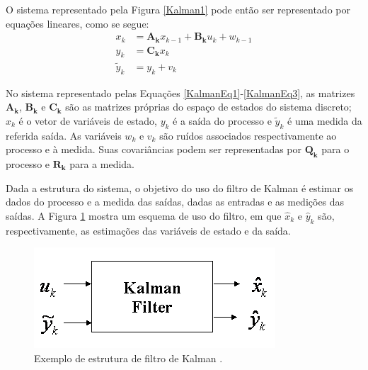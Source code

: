 O sistema representado pela Figura \ref{Kalman1} pode então ser representado por equações lineares, como se segue:
\begin{align}
	\label{KalmanEq1}
	x_k &= \mathbf{A_k} x_{k-1} + \mathbf{B_k} u_k + w_{k-1} \\
	\label{KalmanEq2}
	y_k &= \mathbf{C_k} x_k \\
	\label{KalmanEq3}
	\tilde{y}_k &= y_k + v_k
\end{align}

No sistema representado pelas Equações \ref{KalmanEq1}-\ref{KalmanEq3}, as matrizes $\mathbf{A_k}$, $\mathbf{B_k}$ e $\mathbf{C_k}$ são as matrizes próprias do espaço de estados do sistema discreto; $x_k$ é o vetor de variáveis de estado, $y_k$ é a saída do processo e $\tilde{y}_k$ é uma medida da referida saída. As variáveis $w_k$ e $v_k$ são ruídos associados respectivamente ao processo e à medida. Suas covariâncias podem ser representadas por $\mathbf{Q_k}$ para o processo e $\mathbf{R_k}$ para a medida.

Dada a estrutura do sistema, o objetivo do uso do filtro de Kalman é estimar os dados do processo e a medida das saídas, dadas as entradas e as medições das saídas. A Figura \ref{Kalman2} mostra um esquema de uso do filtro, em que $\hat{x}_k$ e $\hat{y}_k$ são, respectivamente, as estimações das variáveis de estado e da saída.
\begin{figure}[!ht]
\centering
\caption{Exemplo de estrutura de filtro de Kalman \cite{GoddardKalman}. \label{Kalman2}}
\includegraphics[width=.5\linewidth]{figs/kalman/kalman2}
\end{figure}

